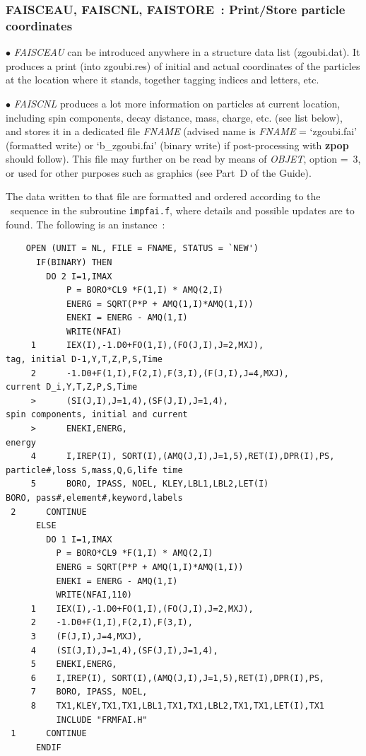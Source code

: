 {\newpage

\subsubsection{FAISCEAU, FAISCNL, FAISTORE~:  Print/Store particle coordinates} \label{FAISCEAU}\label{FAISCNL}
 \label{FAISTORE} 

\medskip 


$\bullet$ \textsl{FAISCEAU}  can be introduced anywhere in a structure 
data list (zgoubi.dat).  It produces a print  (into zgoubi.res) 
of  initial and actual coordinates of the  \IMAX{} particles at the location where it stands, 
together  tagging indices and letters, etc.   

\medskip

\noindent $\bullet$  \textsl{FAISCNL} produces a lot more information on particles at current location, including 
spin components, decay distance, mass, charge, etc. (see list below), and stores it in a 
dedicated file \textsl{FNAME} (advised name is \textsl{FNAME} = `zgoubi.fai'  
(formatted write) or `b\_zgoubi.fai' (binary write) 
if post-processing with \textbf{zpop} should follow).  This file may further on be read by means of  \textsl{OBJET}, 
option \mbox{\KOBJ= 3}, or used for other purposes such as graphics (see Part~D of the Guide).  

\noindent The data written to that file are formatted and  ordered according to the \FORTRAN\ sequence 
in the subroutine \texttt{impfai.f}, where details and possible updates are to found. 
The following is an instance~: 

{\footnotesize
\begin{verbatim}
    OPEN (UNIT = NL, FILE = FNAME, STATUS = `NEW')
      IF(BINARY) THEN
        DO 2 I=1,IMAX
            P = BORO*CL9 *F(1,I) * AMQ(2,I)
            ENERG = SQRT(P*P + AMQ(1,I)*AMQ(1,I))
            ENEKI = ENERG - AMQ(1,I)
            WRITE(NFAI)
     1      IEX(I),-1.D0+FO(1,I),(FO(J,I),J=2,MXJ),                 tag, initial D-1,Y,T,Z,P,S,Time
     2      -1.D0+F(1,I),F(2,I),F(3,I),(F(J,I),J=4,MXJ),            current D_i,Y,T,Z,P,S,Time
     >      (SI(J,I),J=1,4),(SF(J,I),J=1,4),                        spin components, initial and current
     >      ENEKI,ENERG,                                            energy
     4      I,IREP(I), SORT(I),(AMQ(J,I),J=1,5),RET(I),DPR(I),PS,   particle#,loss S,mass,Q,G,life time
     5      BORO, IPASS, NOEL, KLEY,LBL1,LBL2,LET(I)                BORO, pass#,element#,keyword,labels
 2      CONTINUE
      ELSE
        DO 1 I=1,IMAX
          P = BORO*CL9 *F(1,I) * AMQ(2,I)
          ENERG = SQRT(P*P + AMQ(1,I)*AMQ(1,I))
          ENEKI = ENERG - AMQ(1,I)
          WRITE(NFAI,110)
     1    IEX(I),-1.D0+FO(1,I),(FO(J,I),J=2,MXJ),
     2    -1.D0+F(1,I),F(2,I),F(3,I),
     3    (F(J,I),J=4,MXJ),
     4    (SI(J,I),J=1,4),(SF(J,I),J=1,4),
     5    ENEKI,ENERG,
     6    I,IREP(I), SORT(I),(AMQ(J,I),J=1,5),RET(I),DPR(I),PS,
     7    BORO, IPASS, NOEL, 
     8    TX1,KLEY,TX1,TX1,LBL1,TX1,TX1,LBL2,TX1,TX1,LET(I),TX1
          INCLUDE "FRMFAI.H"
 1      CONTINUE
      ENDIF


\end{verbatim}}}
